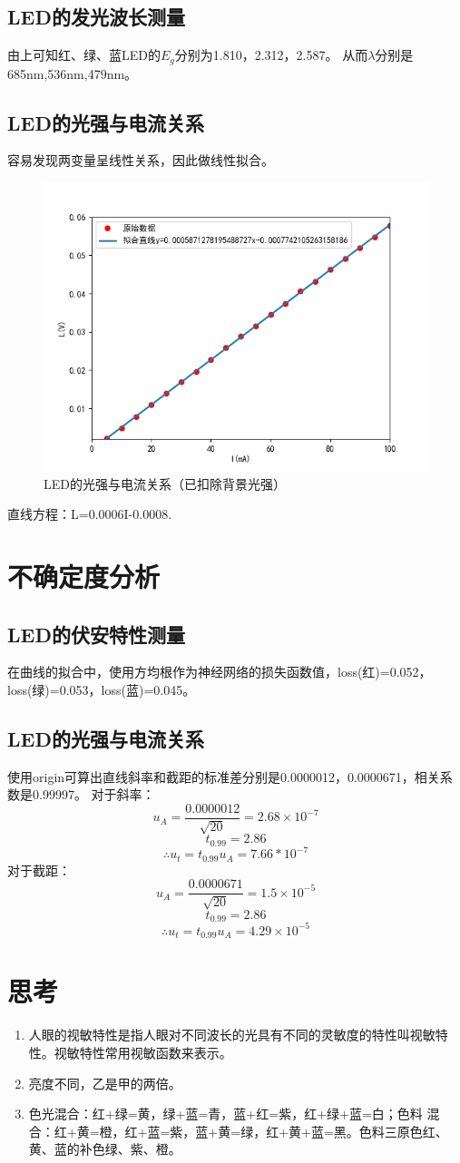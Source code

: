 \documentclass[UTF8]{ctexart}
\begin{document}
\subsection{LED的发光波长测量}
由上可知红、绿、蓝LED的$E_g$分别为1.810，2.312，2.587。
从而$\lambda$分别是685nm,536nm,479nm。
\subsection{LED的光强与电流关系}
容易发现两变量呈线性关系，因此做线性拟合。
\begin{figure}[h]
    \centering
    \includegraphics[scale=1]{光强与电流关系拟合.PNG}
    \caption{LED的光强与电流关系（已扣除背景光强）}
\end{figure}
直线方程：L=0.0006I-0.0008.
\newpage
\section{不确定度分析}
\subsection{LED的伏安特性测量}
在曲线的拟合中，使用方均根作为神经网络的损失函数值，loss(红)=0.052，loss(绿)=0.053，loss(蓝)=0.045。
\subsection{LED的光强与电流关系}
使用origin可算出直线斜率和截距的标准差分别是0.0000012，0.0000671，相关系数是0.99997。
对于斜率：
\[u_A=\frac{0.0000012}{\sqrt{20}}=2.68\times 10^{-7}\]
\[t_{0.99}=2.86\]
\[\therefore u_t=t_{0.99}u_A=7.66*10^{-7}\]
对于截距：
\[u_A=\frac{0.0000671}{\sqrt{20}}=1.5\times 10^{-5}\]
\[t_{0.99}=2.86\]
\[\therefore u_t=t_{0.99}u_A=4.29\times 10^{-5}\]
\section{思考}
\begin{enumerate}
    \item 人眼的视敏特性是指人眼对不同波长的光具有不同的灵敏度的特性叫视敏特性。视敏特性常用视敏函数来表示。
    \item 亮度不同，乙是甲的两倍。
    \item 色光混合：红+绿=黄，绿+蓝=青，蓝+红=紫，红+绿+蓝=白；色料
    混合：红+黄=橙，红+蓝=紫，蓝+黄=绿，红+黄+蓝=黑。色料三原色红、黄、蓝的补色绿、紫、橙。
\end{enumerate}
\end{document}
